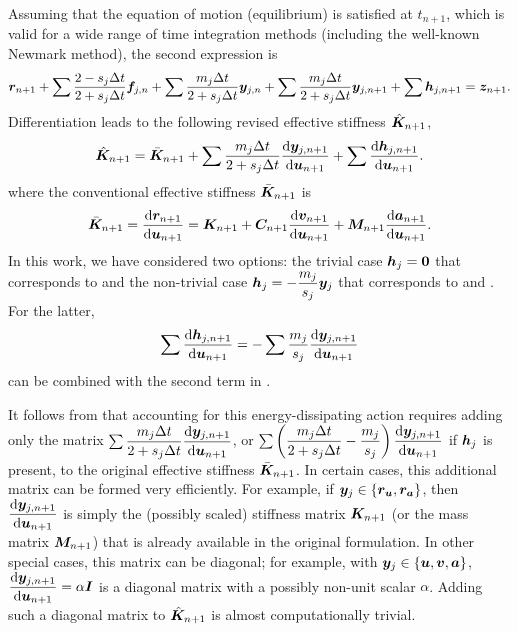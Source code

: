 Assuming that the equation of motion (equilibrium) is satisfied at $t_{n+1}$, which is valid for a wide range of time integration methods (including the well-known Newmark method), the second expression is
\begin{gather}\label{eq:residual}
    \bm{r}_{n+1}+\sum\dfrac{2-s_j\Delta{}t}{2+s_j\Delta{}t}\bm{f}_{j,n}+\sum\dfrac{m_j\Delta{}t}{2+s_j\Delta{}t}\bm{y}_{j,n}+\sum\dfrac{m_j\Delta{}t}{2+s_j\Delta{}t}\bm{y}_{j,n+1}+\sum\bm{h}_{j,n+1}=\bm{z}_{n+1}.
\end{gather}
Differentiation leads to the following revised effective stiffness $\hat{\bm{K}}_{n+1}$,
\begin{gather}\label{eq:revised_k}
    \hat{\bm{K}}_{n+1}=\bar{\bm{K}}_{n+1}+\sum\dfrac{m_j\Delta{}t}{2+s_j\Delta{}t}\dfrac{\mathrm{d}\bm{y}_{j,n+1}}{\mathrm{d}\bm{u}_{n+1}}+\sum\dfrac{\mathrm{d}\bm{h}_{j,n+1}}{\mathrm{d}\bm{u}_{n+1}}.
\end{gather}
where the conventional effective stiffness $\bar{\bm{K}}_{n+1}$ is
\begin{gather}\label{eq:effective_k}
    \bar{\bm{K}}_{n+1}=\dfrac{\mathrm{d}\bm{r}_{n+1}}{\mathrm{d}\bm{u}_{n+1}}=\bm{K}_{n+1}+\bm{C}_{n+1}\dfrac{\mathrm{d}\bm{v}_{n+1}}{\mathrm{d}\bm{u}_{n+1}}+\bm{M}_{n+1}\dfrac{\mathrm{d}\bm{a}_{n+1}}{\mathrm{d}\bm{u}_{n+1}}.
\end{gather}
In this work, we have considered two options: the trivial case $\bm{h}_j=\bm{0}$ that corresponds to  and the non-trivial case $\bm{h}_j=-\dfrac{m_j}{s_j}\bm{y}_j$ that corresponds to  and .
For the latter,
\begin{gather}
    \sum\dfrac{\mathrm{d}\bm{h}_{j,n+1}}{\mathrm{d}\bm{u}_{n+1}}=-\sum\dfrac{m_j}{s_j}\dfrac{\mathrm{d}\bm{y}_{j,n+1}}{\mathrm{d}\bm{u}_{n+1}}
\end{gather}
can be combined with the second term in .

It follows from  that accounting for this energy-dissipating action requires adding only the matrix $\sum\dfrac{m_j\Delta{}t}{2+s_j\Delta{}t}\dfrac{\mathrm{d}\bm{y}_{j,n+1}}{\mathrm{d}\bm{u}_{n+1}}$, or $\sum\left(\dfrac{m_j\Delta{}t}{2+s_j\Delta{}t}-\dfrac{m_j}{s_j}\right)\dfrac{\mathrm{d}\bm{y}_{j,n+1}}{\mathrm{d}\bm{u}_{n+1}}$ if $\bm{h}_j$ is present, to the original effective stiffness $\bar{\bm{K}}_{n+1}$.
In certain cases, this additional matrix can be formed very efficiently.
For example, if $\bm{y}_j\in\{\bm{r}_{\bm{u}},\bm{r}_{\bm{a}}\}$, then $\dfrac{\mathrm{d}\bm{y}_{j,n+1}}{\mathrm{d}\bm{u}_{n+1}}$ is simply the (possibly scaled) stiffness matrix $\bm{K}_{n+1}$ (or the mass matrix $\bm{M}_{n+1}$) that is already available in the original formulation.
In other special cases, this matrix can be diagonal; for example, with $\bm{y}_j\in\{\bm{u},\bm{v},\bm{a}\}$, $\dfrac{\mathrm{d}\bm{y}_{j,n+1}}{\mathrm{d}\bm{u}_{n+1}}=\alpha\bm{I}$ is a diagonal matrix with a possibly non-unit scalar $\alpha$.
Adding such a diagonal matrix to $\hat{\bm{K}}_{n+1}$ is almost computationally trivial.
